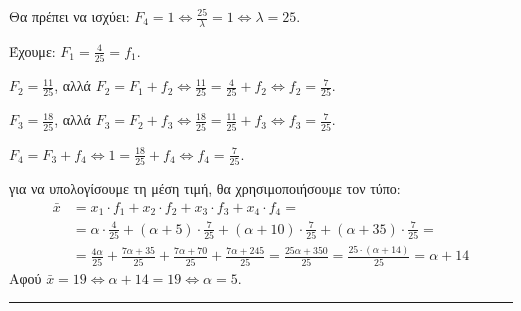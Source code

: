 
\begin{alist}
\item Θα πρέπει να ισχύει: $F_4 = 1 \iff \frac{25}{\lambda} = 1 \iff \lambda = 25$.

\item Έχουμε: $F_1 = \frac{4}{25} = f_1$.

$F_2 = \frac{11}{25}$, αλλά $F_2 = F_1 + f_2 \iff \frac{11}{25} = \frac{4}{25} + f_2 \iff f_2 = \frac{7}{25}$.

$F_3 = \frac{18}{25}$, αλλά $F_3 = F_2 + f_3 \iff \frac{18}{25} = \frac{11}{25} + f_3 \iff f_3 = \frac{7}{25}$.

$F_4 = F_3 + f_4 \iff 1 = \frac{18}{25} + f_4 \iff f_4 = \frac{7}{25}$.

\item για να υπολογίσουμε τη μέση τιμή, θα χρησιμοποιήσουμε τον τύπο:
\begin{align*}
\bar{x} &= x_1 \cdot f_1 + x_2 \cdot f_2 + x_3 \cdot f_3 + x_4 \cdot f_4 = \\
&= \alpha \cdot \frac{4}{25} + (\alpha + 5) \cdot \frac{7}{25} + (\alpha + 10) \cdot \frac{7}{25} + (\alpha + 35) \cdot \frac{7}{25} = \\
&= \frac{4\alpha}{25} + \frac{7\alpha + 35}{25} + \frac{7\alpha + 70}{25} + \frac{7\alpha + 245}{25} = \frac{25\alpha + 350}{25} = \frac{25 \cdot (\alpha + 14)}{25} = \alpha + 14
\end{align*}
Αφού $\bar{x} = 19 \iff \alpha + 14 = 19 \iff \alpha = 5$.
\end{alist}
\vspace{6mm}
\noindent\rule{\textwidth}{0.4pt}
\vspace{6mm}

